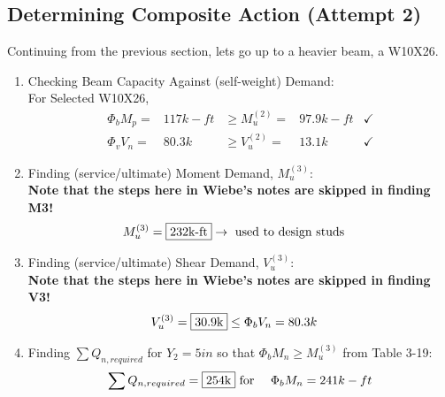 \documentclass{report} %
\begin{document}
\subsection*{Determining Composite Action (Attempt 2)}
Continuing from the previous section, lets go up to a heavier beam, a W10X26.
\begin{enumerate}
    \item Checking Beam Capacity Against (self-weight) Demand: \\
    For Selected W10X26,
        \begin{equation*}
            \begin{aligned}
                \Phi _b M_p = &117k-ft &\geq M^{(2)}_u = &97.9k-ft &\checkmark\\
                \Phi _v V_n = &80.3k &\geq V^{(2)}_u = &13.1k &\checkmark
            \end{aligned}
        \end{equation*}
    \item Finding (service/ultimate) Moment Demand, $M^{(3)}_u$: \\
        \textbf{Note that the steps here in Wiebe's notes are skipped in finding M3!}
        \begin{equation*}
            \begin{aligned}
                M^{(3)}_u   &= \framebox{232k-ft} \rightarrow \text{ used to design studs}
            \end{aligned}
        \end{equation*}
    \item Finding (service/ultimate) Shear Demand, $V^{(3)}_u$: \\
        \textbf{Note that the steps here in Wiebe's notes are skipped in finding V3!}
        \begin{equation*}
            \begin{aligned}
                V^{(3)}_u   &= \framebox{30.9k} \leq \Phi _b V_n = 80.3k
            \end{aligned}
        \end{equation*}
    \item Finding $\sum Q_{n,required}$ for $Y_2 = 5in$ so that  $\Phi _b M_n \geq M^{(3)}_u$ from Table 3-19:
        \begin{equation*}
            \begin{aligned}
                \sum Q_{n,required} = \framebox{254k} & \text{ for } & \Phi _b M_n = 241k-ft
            \end{aligned}
        \end{equation*}

\end{enumerate}
\end{document}
